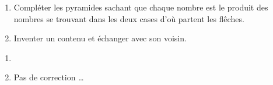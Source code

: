\numeroteEnigme
\begin{enigme}
    \begin{enumerate}
        \item Compléter les pyramides sachant que chaque nombre est le produit
        des nombres se trouvant dans les deux cases d'où partent les flêches.    

        \hfill
        \hfill
        \pagebreak
        \item Inventer un contenu et échanger avec son voisin.
        \begin{center}
        \end{center}
    \end{enumerate}
    \vspace*{-10mm}
\end{enigme}
  
\addtocounter{exercice}{-1}
\begin{corrige}
    \begin{enumerate}
        \item \phantom{rrr}
        \hfill
        \hfill
        \item Pas de correction \ldots
    \end{enumerate}
\end{corrige}